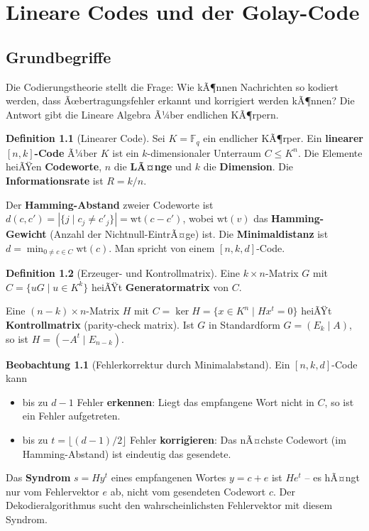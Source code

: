 ﻿\documentclass[a4paper,12pt]{report}
\theoremstyle{definition}
\newtheorem{definition}{Definition}
\newtheorem{beobachtung}{Beobachtung}
\begin{document}
\chapter{Lineare Codes und der Golay-Code}

\section{Grundbegriffe}

Die Codierungstheorie stellt die Frage: Wie kÃ¶nnen Nachrichten so kodiert
werden, dass Ãœbertragungsfehler erkannt und korrigiert werden kÃ¶nnen?
Die Antwort gibt die Lineare Algebra Ã¼ber endlichen KÃ¶rpern.

\begin{definition}[Linearer Code]
    Sei $K = \mathbb{F}_q$ ein endlicher KÃ¶rper. Ein \textbf{linearer
    $[n, k]$-Code} Ã¼ber $K$ ist ein $k$-dimensionaler Unterraum
    $C \leq K^n$. Die Elemente heiÃŸen \textbf{Codeworte},
    $n$ die \textbf{LÃ¤nge} und $k$ die \textbf{Dimension}.
    Die \textbf{Informationsrate} ist $R = k/n$.

    Der \textbf{Hamming-Abstand} zweier Codeworte ist
    $d(c, c') = |\{j \mid c_j \neq c'_j\}| = \mathrm{wt}(c - c')$,
    wobei $\mathrm{wt}(v)$ das \textbf{Hamming-Gewicht} (Anzahl der
    Nichtnull-EintrÃ¤ge) ist.
    Die \textbf{Minimaldistanz} ist $d = \min_{0 \neq c \in C} \mathrm{wt}(c)$.
    Man spricht von einem $[n, k, d]$-Code.
\end{definition}

\begin{definition}[Erzeuger- und Kontrollmatrix]
    Eine $k \times n$-Matrix $G$ mit $C = \{uG \mid u \in K^k\}$
    heiÃŸt \textbf{Generatormatrix} von $C$.

    Eine $(n-k) \times n$-Matrix $H$ mit $C = \ker H = \{x \in K^n \mid Hx^t = 0\}$
    heiÃŸt \textbf{Kontrollmatrix} (parity-check matrix).
    Ist $G$ in Standardform $G = (E_k \mid A)$, so ist $H = (-A^t \mid E_{n-k})$.
\end{definition}

\begin{beobachtung}[Fehlerkorrektur durch Minimalabstand]
    Ein $[n,k,d]$-Code kann
    \begin{itemize}
        \item[-] bis zu $d-1$ Fehler \textbf{erkennen}: Liegt das empfangene Wort
              nicht in $C$, so ist ein Fehler aufgetreten.
        \item[-] bis zu $t = \lfloor(d-1)/2\rfloor$ Fehler \textbf{korrigieren}:
              Das nÃ¤chste Codewort (im Hamming-Abstand) ist eindeutig das gesendete.
    \end{itemize}
    Das \textbf{Syndrom} $s = Hy^t$ eines empfangenen Wortes $y = c + e$
    ist $He^t$ -- es hÃ¤ngt nur vom Fehlervektor $e$ ab, nicht vom
    gesendeten Codewort $c$. Der Dekodieralgorithmus sucht den
    wahrscheinlichsten Fehlervektor mit diesem Syndrom.
\end{beobachtung}
\end{document}
